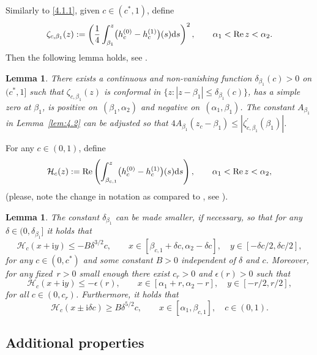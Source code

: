 \documentclass[pdftex]{sigma}
\numberwithin{equation}{section}
\newtheorem{Lemma}[Theorem]{Lemma}
\newcommand{\re}{\operatorname{Re} }
\newcommand{\ic}{\mathrm{i}}
\begin{document}
Similarly to \eqref{4.1.1}, given $ c\in( c^*,1) $, define
\begin{equation}
\label{4.4.1}
\zeta_{c,\beta_1}(z) := \left(\frac14\int_{\beta_1}^z\bigl(h_c^{(0)}-h_c^{(1)}\bigr)(s) {\rm d}s\right)^2, \qquad \alpha_1<\re z<\alpha_2.
\end{equation}
Then the following lemma holds, see \cite[Lemma~7.7]{ApDenYa21}.

\begin{Lemma}
\label{lem:4.4}
There exists a continuous and non-vanishing function $ \delta_{\beta_1}(c)>0 $ on $ (c^*,1] $ such that $ \zeta_{c,\beta_1}(z) $ is conformal in $ \{z : |z-\beta_1|\leq\delta_{\beta_1}(c) \} $, has a simple zero at $ \beta_1 $, is positive on~$ (\beta_1,\alpha_2) $ and negative on~$ (\alpha_1,\beta_1) $. The constant $ A_{\beta_1} $ in Lemma~{\rm\ref{lem:4.2}} can be adjusted so that $ 4A_{\beta_1}(z_c-\beta_1) \leq |\zeta_{c,\beta_1}^\prime(\beta_1)| $.
\end{Lemma}

For any $ c\in(0,1) $, define
\begin{equation}
\label{calH}
\mathcal H_c(z) := \re \left( \int_{\beta_{c,1}}^z \bigl( h_c^{(0)}-h_c^{(1)}\bigr)(s){\rm d}s \right), \qquad \alpha_1<\re z<\alpha_2,
\end{equation}
(please, note the change in notation as compared to \cite[Lemma~7.8]{ApDenYa21}, see \cite[equation~(7.30)]{ApDenYa21}).

\begin{Lemma}
\label{lem:4.6}
The constant $ \delta_{\beta_1} $ can be made smaller, if necessary, so that for any $ \delta\in(0,\delta_{\beta_1}] $ it holds that
\[
\mathcal H_c(x+\ic y) \leq -B\delta^{3/2}c, \qquad x\in[\beta_{c,1}+\delta c,\alpha_2-\delta c], \quad y\in[-\delta c/2,\delta c/2],
\]
for any $ c\in(0,c^*) $ and some constant $ B>0 $ independent of $ \delta $ and $ c $. Moreover, for any fixed~${ r>0} $ small enough there exist $ c_r>0 $ and $ \epsilon(r)>0 $ such that
\[
\mathcal H_c(x+\ic y) \leq -\epsilon(r), \qquad x\in[\alpha_1+r,\alpha_2-r],\quad y\in[-r/2,r/2],
\]
for all $ c\in(0,c_r) $. Furthermore, it holds that
\[
\mathcal H_c(x \pm \ic\delta c) \geq B\delta^{5/2} c, \qquad x\in[\alpha_1,\beta_{c,1}], \quad c\in(0,1).
\]
\end{Lemma}

\subsection{Additional properties}
\end{document}
